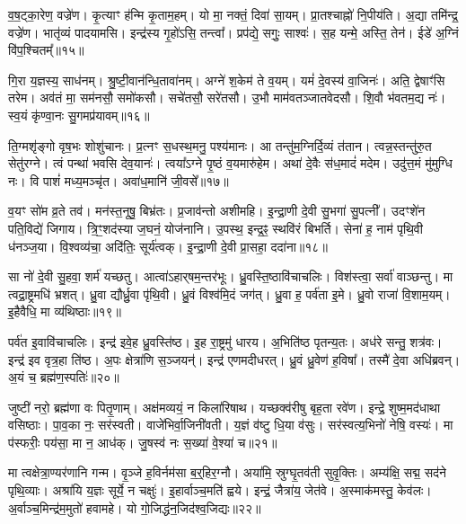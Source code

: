 व॒ष॒ट्का॒रेण॒ वज्रे॑ण।
कृ॒त्याꣳ ह॑न्मि कृ॒ताम॒हम्।
यो मा॒ नक्तं॒ दिवा॑ सा॒यम्।
प्रा॒तश्चाह्नो॑ नि॒पीय॑ति।
अ॒द्या तमि॑न्द्र॒ वज्रे॑ण।
भातृ॑व्यं पादयामसि।
इन्द्र॑स्य गृ॒हो॑ऽसि॒ तन्त्वा᳚।
प्रप॑द्ये॒ सगुः॒ साश्वः॑।
स॒ह यन्मे॒ अस्ति॒ तेन॑।
ईडे॑ अ॒ग्निं वि॑प॒श्चितम्᳚॥१५॥\ip

गि॒रा य॒ज्ञस्य॒ साध॑नम्।
श्रु॒ष्टी॒वान॑न्धि॒तावा॑नम्।
अग्ने॑ श॒केम॑ ते व॒यम्।
यमं॑ दे॒वस्य॑ वा॒जिनः॑।
अति॒ द्वेषाꣳ॑सि तरेम।
अव॑तं मा॒ सम॑नसौ॒ समो॑कसौ।
सचे॑तसौ॒ सरे॑तसौ।
उ॒भौ माम॑वतञ्जातवेदसौ।
शि॒वौ भ॑वतम॒द्य नः॑।
स्व॒यं कृ॑ण्वा॒नः सु॒गमप्र॑यावम्॥१६॥\ip

ति॒ग्मशृ॑ङ्गो वृष॒भः शोशु॑चानः।
प्र॒त्नꣳ स॒धस्थ॒मनु॒ पश्य॑मानः।
आ तन्तु॑म॒ग्निर्दि॒व्यं त॑तान।
त्वन्न॒स्तन्तु॑रु॒त सेतु॑रग्ने।
त्वं पन्था॑ भवसि देव॒यानः॑।
त्वया᳚\-ऽग्ने पृ॒ष्ठं व॒यमारु॑हेम।
अथा॑ दे॒वैः स॑ध॒मादं॑ मदेम।
उदु॑त्त॒मं मु॑मुग्धि नः।
वि पाशं॑ मध्य॒मञ्चृ॑त।
अवा॑ध॒मानि॑ जी॒वसे᳚॥१७॥\ip

व॒यꣳ सो॑म व्र॒ते तव॑।
मन॑स्त॒नूषु॒ बिभ्र॑तः।
प्र॒जाव॑न्तो अशीमहि।
इ॒न्द्रा॒णी दे॒वी सु॒भगा॑ सु॒पत्नी᳚।
उदꣳशे॑न पति॒विद्ये॑ जिगाय।
त्रि॒ꣳ॒शद॑स्या ज॒घनं॒ योज॑नानि।
उ॒पस्थ॒ इन्द्र॒ꣴ॒ स्थवि॑रं बिभर्ति।
सेना॑ ह॒ नाम॑ पृथि॒वी ध॑नञ्ज॒या।
वि॒श्वव्य॑चा॒ अदि॑तिः॒ सूर्य॑त्वक्।
इ॒न्द्रा॒णी दे॒वी प्रा॒सहा॒ ददा॑ना॥१८॥\ip

सा नो॑ दे॒वी सु॒हवा॒ शर्म॑ यच्छतु।
आत्वा॑\-ऽहार्‌\mbox{}षम॒न्तर॑भूः।
ध्रु॒वस्ति॒ष्ठावि॑चाचलिः।
विश॑स्त्वा॒ सर्वा॑ वाञ्छन्तु।
मा त्वद्रा॒ष्ट्रमधि॑ भ्रशत्।
ध्रु॒वा द्यौर्ध्रु॒वा पृ॑थि॒वी।
ध्रु॒वं विश्व॑मि॒दं जग॑त्।
ध्रु॒वा ह॒ पर्व॑ता इ॒मे।
ध्रु॒वो राजा॑ वि॒शाम॒यम्।
इ॒हैवैधि॒ मा व्य॑थिष्ठाः॥१९॥\ip

पर्व॑त इ॒वावि॑चाचलिः।
इन्द्र॑ इवे॒ह ध्रु॒वस्ति॑ष्ठ।
इ॒ह रा॒ष्ट्रमु॑ धारय।
अ॒भिति॑ष्ठ पृतन्य॒तः।
अध॑रे सन्तु॒ शत्र॑वः।
इन्द्र॑ इव वृत्र॒हा ति॑ष्ठ।
अ॒पः क्षेत्रा॑णि स॒ञ्जयन्॑।
इन्द्र॑ एणमदीधरत्।
ध्रु॒वं ध्रु॒वेण॑ ह॒विषा᳚।
तस्मै॑ दे॒वा अधि॑ब्रवन्।
अ॒यं च॒ ब्रह्म॑ण॒स्पतिः॑॥२०॥\ip\anuvakamend[ह॒विर्भि॑रा॒स्य॑मभि॒ दास॑तो विप॒श्चित॒मप्र॑यावञ्जी॒वसे॒ ददा॑ना व्यथिष्ठा ब्रव॒न्नेकं॑ च]

जुष्टी॑ नरो॒ ब्रह्म॑णा वः पितृ॒णाम्।
अक्ष॑मव्ययं॒ न किला॑रिषाथ।
यच्छक्व॑रीषु बृह॒ता रवे॑ण।
इन्द्रे॒ शुष्म॒मद॑धाथा वसिष्ठाः।
पा॒व॒का नः॒ सर॑स्वती।
वाजे॑भिर्वा॒जिनी॑वती।
य॒ज्ञं व॑ष्टु धि॒या व॑सुः।
सर॑स्वत्य॒भिनो॑ नेषि॒ वस्यः॑।
मा प॑स्फरीः॒ पय॑सा॒ मा न॒ आध॑क्।
जु॒षस्व॑ नः स॒ख्या॑ वे॒श्या॑ च॥२१॥\ip

मा त्वक्षेत्रा॒ण्यर॑णानि गन्म।
वृ॒ञ्जे ह॒विर्नम॑सा ब॒र्॒हिर॒ग्नौ।
अया॑मि॒ स्रुग्घृ॒तव॑ती सुवृ॒क्तिः।
अम्य॑क्षि॒ सद्म॒ सद॑ने पृथि॒व्याः।
अश्रा॑यि य॒ज्ञः सूर्ये॒ न चक्षुः॑।
इ॒हार्वाञ्च॒मति॑ ह्वये।
इन्द्रं॒ जैत्रा॑य॒ जेत॑वे।
अ॒स्माक॑मस्तु॒ केव॑लः।
अ॒र्वाञ्च॒मिन्द्र॑म॒मुतो॑ हवामहे।
यो गो॒जिद्ध॑न॒जिद॑श्व॒\-जिद्यः॥२२॥\ip


